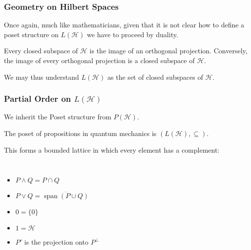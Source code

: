\documentclass{beamer}
\DeclareMathOperator{\Span}{span}
\begin{document}
\begin{frame}

	\frametitle{Geometry on Hilbert Spaces}
	
	Once again, much like mathematicians, given that it is not clear how to define a poset structure on $L(\mathcal{H})$ we have to proceed by duality.
	
	\begin{theorem}
	
		Every closed subspace of $\mathcal{H}$ is the image of an orthogonal projection. Conversely, the image of every orthogonal projection is a closed subspace of $\mathcal{H}$.	
	
	\end{theorem}
	
	We may thus understand $L(\mathcal{H})$ as the set of closed subspaces of $\mathcal{H}$.

\end{frame}	

\begin{frame}

	\frametitle{Partial Order on $L(\mathcal{H})$}
	
	We inherit the Poset structure from $P(\mathcal{H})$. 
	
	\begin{definition}
	
		The poset of propositions in quantum mechanics is $(L(\mathcal{H}),\subseteq)$.	
	
	\end{definition}

This forms a bounded lattice in which every element has a complement:

	\begin{columns}

		\begin{itemize}
	
			\item $P\wedge Q=P\cap Q$
			\item $P\vee Q = \overline{\Span (P\cup Q)}$
			\item $0=\{0\}$
			\item $1=\mathcal{H}$
			\item $P'$ is the projection onto $P^\bot$
	
		\end{itemize}


	\end{columns}
	
\end{frame}
\end{document}
